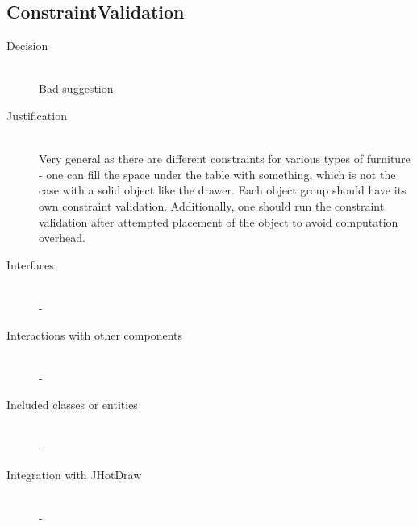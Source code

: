 \subsection{ConstraintValidation}
	\begin{description}
		\item[Decision] \hfill \\ Bad suggestion
		\item[Justification] \hfill \\ Very general as there are different constraints for various types of furniture - one can fill the space under the table with something, which is not the case with a solid object like the drawer. Each object group should have its own constraint validation. Additionally, one should run the constraint validation after attempted placement of the object to avoid computation overhead.
		\item[Interfaces] \hfill \\ -
		\item[Interactions with other components] \hfill \\ -
		\item[Included classes or entities] \hfill \\ -
		\item[Integration with JHotDraw] \hfill \\ -
	\end{description}
